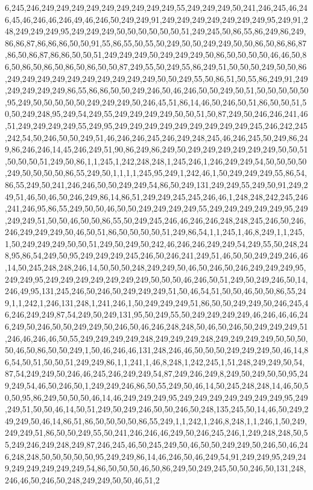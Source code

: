 6,245,246,249,249,249,249,249,249,249,249,249,55,249,249,249,50,241,246,245,46,246,45,46,246,46,246,49,46,246,50,249,249,91,249,249,249,249,249,249,249,95,249,91,248,249,249,249,95,249,249,249,50,50,50,50,50,50,51,249,245,50,86,55,86,249,86,249,86,86,87,86,86,86,50,50,91,55,86,55,50,55,50,249,50,50,249,249,50,50,86,50,86,86,87,86,50,86,87,86,86,50,50,51,249,249,249,50,249,249,249,50,86,50,50,50,50,46,46,50,86,50,86,50,86,50,86,50,86,50,50,87,249,55,50,249,55,86,249,51,50,50,50,249,50,50,86,249,249,249,249,249,249,249,249,249,249,50,50,249,55,50,86,51,50,55,86,249,91,249,249,249,249,249,86,55,86,86,50,50,249,246,50,46,246,50,50,249,50,51,50,50,50,50,50,95,249,50,50,50,50,50,249,249,249,50,246,45,51,86,14,46,50,246,50,51,86,50,50,51,50,50,249,248,95,249,54,249,55,249,249,249,249,50,50,51,50,87,249,50,246,246,241,46,51,249,249,249,249,55,249,95,249,249,249,249,249,249,249,249,249,245,246,242,245,242,54,50,246,50,50,249,51,46,246,246,245,246,249,248,245,46,246,245,50,249,86,249,86,246,246,14,45,246,249,51,90,86,249,86,249,50,249,249,249,249,249,249,50,50,51,50,50,50,51,249,50,86,1,1,245,1,242,248,248,1,245,246,1,246,249,249,54,50,50,50,50,249,50,50,50,50,86,55,249,50,1,1,1,1,245,95,249,1,242,46,1,50,249,249,249,55,86,54,86,55,249,50,241,246,246,50,50,249,249,54,86,50,249,131,249,249,55,249,50,91,249,249,51,46,50,46,50,246,249,86,14,86,51,249,249,245,245,246,46,1,248,248,242,245,246,241,246,95,86,55,249,50,50,46,50,50,249,249,249,249,55,249,249,249,249,249,95,249,249,249,51,50,50,46,50,50,86,55,50,249,245,246,46,246,246,248,248,245,246,50,246,246,249,249,249,50,46,50,51,86,50,50,50,50,51,249,86,54,1,1,245,1,46,8,249,1,1,245,1,50,249,249,249,50,50,51,249,50,249,50,242,46,246,246,249,249,54,249,55,50,248,248,95,86,54,249,50,95,249,249,249,245,246,50,246,241,249,51,46,50,50,249,249,246,46,14,50,245,248,248,246,14,50,50,50,248,249,249,50,46,50,246,50,246,249,249,249,95,249,249,95,249,249,249,249,249,249,249,50,50,50,46,246,50,51,249,50,249,246,50,14,246,49,95,131,245,246,50,246,50,249,249,249,51,50,46,54,51,50,50,46,50,50,86,55,249,1,1,242,1,246,131,248,1,241,246,1,50,249,249,249,51,86,50,50,249,249,50,246,245,46,246,249,249,87,54,249,50,249,131,95,50,249,55,50,249,249,249,249,46,246,46,46,246,249,50,246,50,50,249,249,50,246,50,46,246,248,248,50,46,50,246,50,249,249,249,51,246,46,246,46,50,55,249,249,249,249,248,249,249,249,248,249,249,249,249,50,50,50,50,46,50,86,50,50,249,1,50,46,246,46,131,248,246,46,50,50,50,249,249,249,50,46,14,86,54,50,51,50,50,51,249,249,86,1,1,241,1,46,8,248,1,242,245,1,51,248,249,249,50,54,87,54,249,249,50,246,46,245,246,249,249,54,87,249,246,249,8,249,50,249,50,50,95,249,249,54,46,50,246,50,1,249,249,246,86,50,55,249,50,46,14,50,245,248,248,14,46,50,50,50,95,86,249,50,50,50,46,14,46,249,249,249,95,249,249,249,249,249,249,249,95,249,249,51,50,50,46,14,50,51,249,50,249,246,50,50,246,50,248,135,245,50,14,46,50,249,249,249,50,46,14,86,51,86,50,50,50,50,86,55,249,1,1,242,1,246,8,248,1,1,246,1,50,249,249,249,51,86,50,50,249,55,50,241,246,246,46,249,50,246,245,246,1,249,248,248,50,55,249,246,249,248,249,87,246,245,46,50,245,249,50,46,50,50,249,249,50,246,50,46,246,248,248,50,50,50,50,50,95,249,249,86,14,46,246,50,46,249,54,91,249,249,95,249,249,249,249,249,249,249,54,86,50,50,50,46,50,86,249,50,249,245,50,50,246,50,131,248,246,46,50,246,50,248,249,249,50,50,46,51,2